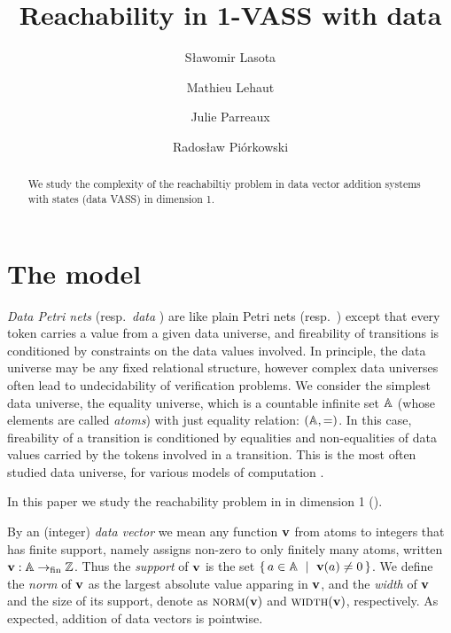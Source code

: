 \documentclass[a4paper,UKenglish,cleveref, autoref, thm-restate,dvipsnames,anonymous]{lipics-v2021}
\title{Reachability in 1-VASS with data} %
\author{S{\l}awomir Lasota}{University of Warsaw}{}{https://orcid.org/0000-0001-8674-4470}{Partially supported by ERC grant INFSYS, agreement no. 950398 and 
by the NCN grant 2024/55/B/ST6/01674.}
\author{Mathieu Lehaut}{University of Warsaw}{}{https://orcid.org/0000-0002-6205-0682}{Partially supported by the NCN grant 2021/41/B/ST6/00535.}
\author{Julie Parreaux}{Univ Rennes, Inria, CNRS, IRISA}{}{https://orcid.org/0009-0009-2744-780X}{Partially supported by the ANR project BisoUS (ANR-22-CE48-0012).}
\author{Rados{\l}aw Pi{\'o}rkowski}{University of Oxford}{}{https://orcid.org/0000-0002-9643-182X}{}
\begin{document}
\maketitle

\begin{abstract}
We study the complexity of the reachabiltiy problem in data vector addition systems 
with states (data VASS)
in dimension 1.
\end{abstract}


\newpage

\section{The model}

\emph{Data Petri nets} (resp.~\emph{data \vass}) are like plain Petri nets 
(resp.~\vass) except that every 
token carries a value from a given data universe, and fireability of transitions is 
conditioned by constraints on the data values involved.
In principle, the data universe may be any fixed relational structure, however
complex data universes often lead to undecidability of verification problems.
We consider the simplest data universe, the equality universe, which 
is a countable infinite set $\mathbb{A}$ (whose elements are called \emph{atoms}) 
with just equality relation: $(\mathbb{A}, =)$. 
In this case, fireability of a transition is conditioned by equalities and non-equalities
of data values carried by the tokens involved in a transition.
This is the most often studied data universe, for various models of computation
\cite{}.

In this paper we study the reachability problem in \dvass in dimension 1 (\donevass). 

 

By an (integer) \emph{data vector} we mean any function $\mathbf{v}$
from atoms to integers that has finite 
support, namely assigns non-zero to only finitely many atoms, written
$\mathbf{v} : \mathbb{A} \to_{\text{fin}} \mathbb{Z}$.
Thus the \emph{support} of $\mathbf{v}$ is the set $\{\,a\in\mathbb{A} \ \mid \ \mathbf{v}(a)\neq 0\,\}$.
We define the \emph{norm} of $\mathbf{v}$ as the largest absolute value apparing in $\mathbf{v}$,
and the \emph{width} of $\mathbf{v}$ and the size of its support,
denote as $\textsc{norm}(\mathbf{v})$ and $\textsc{width}(\mathbf{v})$, respectively.
As expected, addition of data vectors is pointwise.
\end{document}

